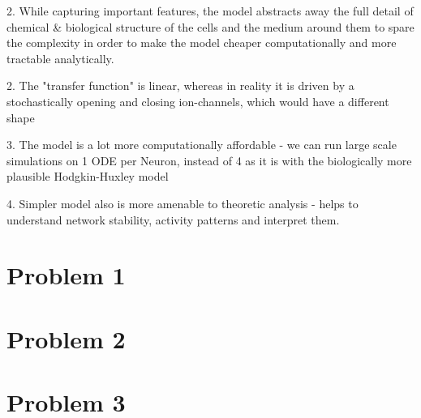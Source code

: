 \documentclass{article}
\begin{document}
2. While capturing important features, the model abstracts away the 
full detail of chemical \& biological structure of the cells and the medium around them 
to spare the  complexity in order to make the model cheaper computationally and more
tractable analytically. 

2. The "transfer function" is linear, whereas in reality
it is driven by a stochastically opening and closing ion-channels, which would
have a different shape

3. The model is a lot more computationally affordable - we can run large scale simulations
on 1 ODE per Neuron, instead of 4 as it is with the biologically more plausible Hodgkin-Huxley model

4. Simpler model also is more amenable to theoretic analysis - helps to understand
network stability, activity patterns and interpret them.



\section{Problem 1}

\section{Problem 2}

\section{Problem 3}
\end{document}
